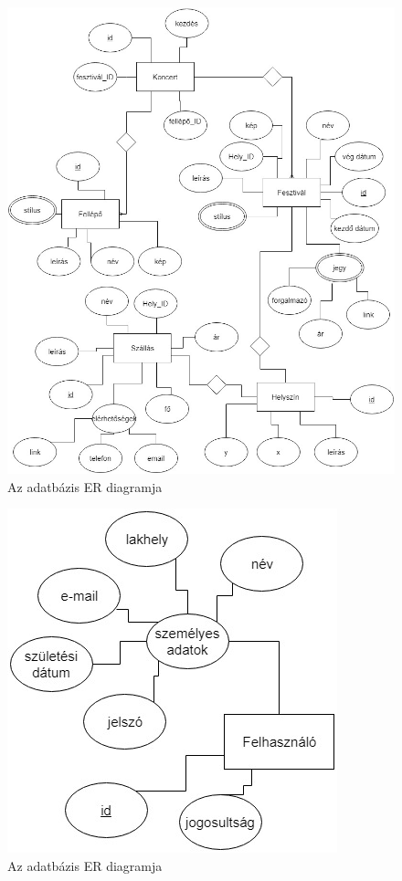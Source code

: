 \begin{figure}[h!]
\centering
\includegraphics[scale=0.5]{kepek/er.jpg}
\caption{Az adatbázis ER diagramja}
\label{fig:er}
\end{figure}

\begin{figure}[h!]
\centering
\includegraphics[scale=0.7]{kepek/userER.jpg}
\caption{Az adatbázis ER diagramja}
\label{fig:usEr}
\end{figure}

